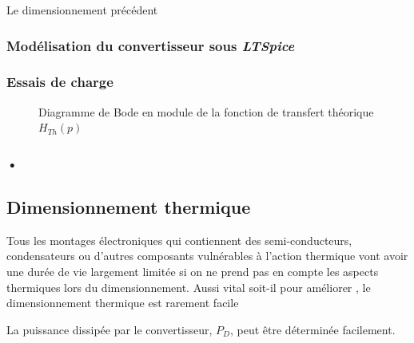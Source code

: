 			Le dimensionnement précédent
			
				\subsubsection{Modélisation du convertisseur sous \textit{LTSpice}}
				
				\subsubsection{Essais de charge}
				
				\begin{figure}[h]
\begin{center}
\end{center}
\label{filtre_th}
\caption{Diagramme de Bode en module de la fonction de transfert théorique $H_{Th}(p)$}
\end{figure}
				
				\subsubsection{•}
				
			
			\subsection{Dimensionnement thermique}
			
			Tous les montages électroniques qui contiennent des semi-conducteurs, condensateurs ou d'autres composants vulnérables à l'action thermique vont avoir une durée de vie largement limitée si on ne prend pas en compte les aspects thermiques lors du dimensionnement. Aussi vital soit-il pour améliorer , le dimensionnement thermique est rarement facile 	
			
			La puissance dissipée par le convertisseur, $P_D$, peut être déterminée facilement.
			
